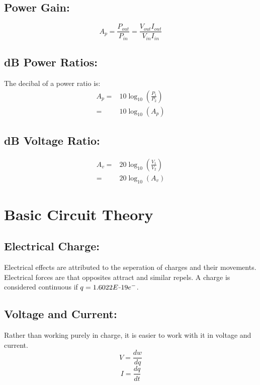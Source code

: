 \documentclass[a5paper]{article}
\newcommand{\minus}{\scalebox{0.5}[1.0]{$-$}}
\begin{document}
	\subsection{Power Gain:}
	$$A_{p}=\frac{P_{out}}{P_{in}}=\frac{V_{out}I_{out}}{V_{in}I_{in}}$$
	\subsection{dB Power Ratios:}
	The decibal of a power ratio is:
	\begin{align*}
		A_{p}=&10\log_{10}{(\frac{P_{1}}{P_{2}})}\\
		=&10\log_{10}{(A_{p})}
	\end{align*}
	\subsection{dB Voltage Ratio:}
	\begin{align*}
		A_{v}=&20\log_{10}{(\frac{V_{1}}{V_{2}})}\\
		=&20\log_{10}{(A_{v})}
	\end{align*}

	\section{Basic Circuit Theory}
	\subsection{Electrical Charge:}
	Electrical effects are attributed to the seperation of charges and their movements. Electrical forces are that opposites attract and similar repels. A charge is considered continuous if $q=1.6022E\minus19e^{-}$.
	\subsection{Voltage and Current:}
	Rather than working purely in charge, it is easier to work with it in voltage and current.
	$$V=\frac{dw}{dq}$$
	$$I=\frac{dq}{dt}$$
\end{document}
